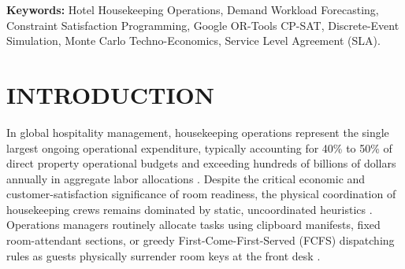 \documentclass[11pt,a4paper]{article}
\begin{document}
\vspace{0.5em}
\noindent\textbf{Keywords:} Hotel Housekeeping Operations, Demand Workload Forecasting, Constraint Satisfaction Programming, Google OR-Tools CP-SAT, Discrete-Event Simulation, Monte Carlo Techno-Economics, Service Level Agreement (SLA).

\vspace{1.5em}

\section{INTRODUCTION}

In global hospitality management, housekeeping operations represent the single largest ongoing operational expenditure, typically accounting for 40\% to 50\% of direct property operational budgets and exceeding hundreds of billions of dollars annually in aggregate labor allocations \cite{weatherford2003,chan2013}. Despite the critical economic and customer-satisfaction significance of room readiness, the physical coordination of housekeeping crews remains dominated by static, uncoordinated heuristics \cite{pizam2017}. Operations managers routinely allocate tasks using clipboard manifests, fixed room-attendant sections, or greedy First-Come-First-Served (FCFS) dispatching rules as guests physically surrender room keys at the front desk \cite{hancer2003}. 
\end{document}
